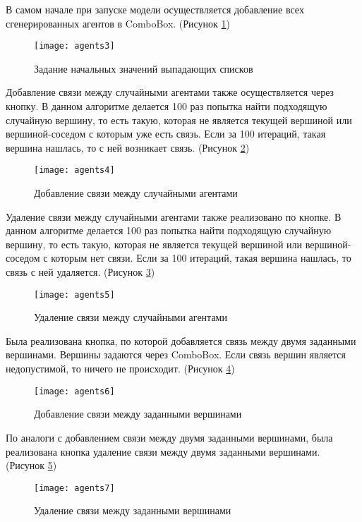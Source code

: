 \newpage

В самом начале при запуске модели осуществляется добавление всех сгенерированных агентов в ComboBox. (Рисунок \ref{fig:agents3})
\begin{figure}[h]
	\centering \texttt{[image: agents3]}
	\caption{Задание начальных значений выпадающих списков}
	\label{fig:agents3}
\end{figure}

Добавление связи между случайными агентами также осуществляется через кнопку. В данном алгоритме делается 100 раз попытка найти подходящую случайную вершину, то есть такую, которая не является текущей вершиной или вершиной-соседом с которым уже есть связь. Если за 100 итераций, такая вершина нашлась, то с ней возникает связь. (Рисунок \ref{fig:agents4})
\begin{figure}[h]
	\centering \texttt{[image: agents4]}
	\caption{Добавление связи между случайными агентами}
	\label{fig:agents4}
\end{figure}

Удаление связи между случайными агентами также реализовано по кнопке. В данном алгоритме делается 100 раз попытка найти подходящую случайную вершину, то есть такую, которая не является текущей вершиной или вершиной-соседом с которым нет связи. Если за 100 итераций, такая вершина нашлась, то связь с ней удаляется. (Рисунок \ref{fig:agents5})
\begin{figure}[h]
	\centering \texttt{[image: agents5]}
	\caption{Удаление связи между случайными агентами}
	\label{fig:agents5}
\end{figure}

Была реализована кнопка, по которой добавляется связь между двумя заданными вершинами. Вершины задаются через ComboBox. Если связь вершин является недопустимой, то ничего не происходит. (Рисунок \ref{fig:agents6})
\begin{figure}[h]
	\centering \texttt{[image: agents6]}
	\caption{Добавление связи между заданными вершинами}
	\label{fig:agents6}
\end{figure}

\newpage

По аналоги с добавлением связи между двумя заданными вершинами, была реализована кнопка удаление связи между двумя заданными вершинами. (Рисунок \ref{fig:agents7})
\begin{figure}[h]
	\centering \texttt{[image: agents7]}
	\caption{Удаление связи между заданными вершинами}
	\label{fig:agents7}
\end{figure}

